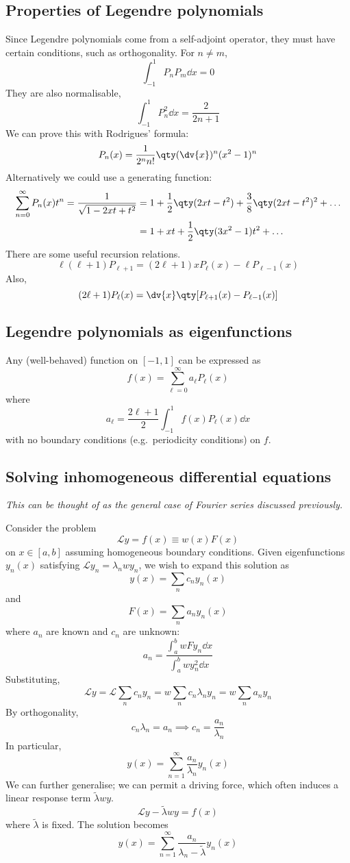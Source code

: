 \subsection{Properties of Legendre polynomials}
Since Legendre polynomials come from a self-adjoint operator, they must have certain conditions, such as orthogonality.
For \( n \neq m \),
\[
	\int_{-1}^1 P_n P_m \dd{x} = 0
\]
They are also normalisable,
\[
	\int_{-1}^1 P_n^2 \dd{x} = \frac{2}{2n+1}
\]
We can prove this with Rodrigues' formula:
\[
	P_n(x) = \frac{1}{2^n n!} \qty( \dv{x} )^n (x^2 - 1)^n
\]
Alternatively we could use a generating function:
\begin{align*}
	\sum_{n=0}^\infty P_n(x) t^n = \frac{1}{\sqrt{1 - 2xt + t^2}} & = 1 + \frac{1}{2}\qty(2xt - t^2) + \frac{3}{8}\qty(2xt - t^2)^2 + \dots \\
	                                                              & = 1 + xt + \frac{1}{2}\qty(3x^2 - 1)t^2 + \dots
\end{align*}
There are some useful recursion relations.
\[
	\ell(\ell + 1) P_{\ell + 1} = (2 \ell + 1) x P_\ell(x) - \ell P_{\ell - 1}(x)
\]
Also,
\[
	(2\ell + 1)P_\ell(x) = \dv{x} \qty[ P_{\ell + 1}(x) - P_{\ell - 1}(x) ]
\]

\subsection{Legendre polynomials as eigenfunctions}
Any (well-behaved) function on \( [-1,1] \) can be expressed as
\[
	f(x) = \sum_{\ell = 0}^\infty a_\ell P_\ell(x)
\]
where
\[
	a_\ell = \frac{2\ell + 1}{2} \int_{-1}^1 f(x) P_\ell(x) \dd{x}
\]
with no boundary conditions (e.g.\ periodicity conditions) on \( f \).

\subsection{Solving inhomogeneous differential equations}
\textit{This can be thought of as the general case of Fourier series discussed previously.}

Consider the problem
\[
	\mathcal L y = f(x) \equiv w(x) F(x)
\]
on \( x \in [a,b] \) assuming homogeneous boundary conditions.
Given eigenfunctions \( y_n(x) \) satisfying \( \mathcal L y_n = \lambda_n w y_n \), we wish to expand this solution as
\[
	y(x) = \sum_n c_n y_n(x)
\]
and
\[
	F(x) = \sum_n a_n y_n(x)
\]
where \( a_n \) are known and \( c_n \) are unknown:
\[
	a_n = \frac{\int_a^b w F y_n \dd{x}}{\int_a^b w y_n^2 \dd{x}}
\]
Substituting,
\[
	\mathcal L y = \mathcal L \sum_n c_n y_n = w \sum_n c_n \lambda_n y_n = w \sum_n a_n y_n
\]
By orthogonality,
\[
	c_n \lambda_n = a_n \implies c_n = \frac{a_n}{\lambda_n}
\]
In particular,
\[
	y(x) = \sum_{n=1}^\infty \frac{a_n}{\lambda_n}y_n(x)
\]
We can further generalise; we can permit a driving force, which often induces a linear response term \( \widetilde\lambda w y \).
\[
	\mathcal L y - \widetilde \lambda w y = f(x)
\]
where \( \widetilde \lambda \) is fixed.
The solution becomes
\[
	y(x) = \sum_{n=1}^\infty \frac{a_n}{\lambda_n - \widetilde \lambda} y_n(x)
\]

